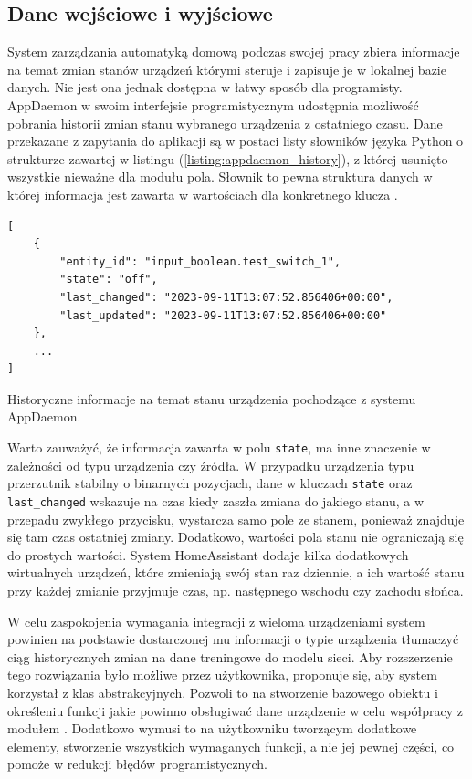 \subsection{Dane wejściowe i wyjściowe}
System zarządzania automatyką domową podczas swojej pracy zbiera informacje na temat zmian stanów urządzeń którymi steruje i zapisuje je w lokalnej bazie danych. Nie jest ona jednak dostępna w łatwy sposób dla programisty. AppDaemon w swoim interfejsie programistycznym udostępnia możliwość pobrania historii zmian stanu wybranego urządzenia z ostatniego czasu. Dane przekazane z zapytania do aplikacji są w postaci listy słowników języka Python o strukturze zawartej w listingu (\ref{listing:appdaemon_history}), z której usunięto wszystkie nieważne dla modułu pola. Słownik to pewna struktura danych w której informacja jest zawarta w wartościach dla konkretnego klucza \cite{book:learning_python}.

\begin{listing}
\begin{verbatim}
[
    {
        "entity_id": "input_boolean.test_switch_1",
        "state": "off",
        "last_changed": "2023-09-11T13:07:52.856406+00:00",
        "last_updated": "2023-09-11T13:07:52.856406+00:00"
    },
    ...
]
\end{verbatim}
\caption{Historyczne informacje na temat stanu urządzenia pochodzące z systemu AppDaemon.} \label{listing:appdaemon_history}
\end{listing}

Warto zauważyć, że informacja zawarta w polu \verb+state+, ma inne znaczenie w zależności od typu urządzenia czy źródła. W przypadku urządzenia typu przerzutnik stabilny o binarnych pozycjach, dane w kluczach \verb+state+ oraz \verb+last_changed+ wskazuje na czas kiedy zaszła zmiana do jakiego stanu, a w przepadu zwykłego przycisku, wystarcza samo pole ze stanem, ponieważ znajduje się tam czas ostatniej zmiany. Dodatkowo, wartości pola stanu nie ograniczają się do prostych wartości. System HomeAssistant dodaje kilka dodatkowych wirtualnych urządzeń, które zmieniają swój stan raz dziennie, a ich wartość stanu przy każdej zmianie przyjmuje czas, np. następnego wschodu czy zachodu słońca.

W celu zaspokojenia wymagania integracji z wieloma urządzeniami system powinien na podstawie dostarczonej mu informacji o typie urządzenia tłumaczyć ciąg historycznych zmian na dane treningowe do modelu sieci. Aby rozszerzenie tego rozwiązania było możliwe przez użytkownika, proponuje się, aby system korzystał z klas abstrakcyjnych. Pozwoli to na stworzenie bazowego obiektu i określeniu funkcji jakie powinno obsługiwać dane urządzenie w celu współpracy z modułem \cite{book:czysty_kod}. Dodatkowo wymusi to na użytkowniku tworzącym dodatkowe elementy, stworzenie wszystkich wymaganych funkcji, a nie jej pewnej części, co pomoże w redukcji błędów programistycznych.

